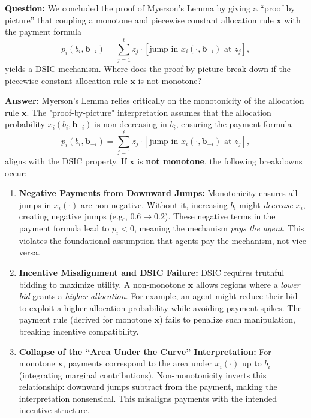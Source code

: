 \documentclass[12pt]{article}
\begin{document}
\textbf{Question:}  
We concluded the proof of Myerson’s Lemma by giving a “proof by picture” that coupling a monotone and piecewise constant allocation rule $\mathbf{x}$ with the payment formula
\[
p_i(b_i, \mathbf{b}_{-i}) = \sum_{j=1}^{\ell} z_j \cdot [\text{jump in } x_i(\cdot, \mathbf{b}_{-i}) \text{ at } z_j],
\]
yields a DSIC mechanism. Where does the proof-by-picture break down if the piecewise constant allocation rule $\mathbf{x}$ is not monotone?

\textbf{Answer:} Myerson’s Lemma relies critically on the monotonicity of the allocation rule $\mathbf{x}$. The "proof-by-picture" interpretation assumes that the allocation probability $x_i(b_i, \mathbf{b}_{-i})$ is non-decreasing in $b_i$, ensuring the payment formula
\[
p_i(b_i, \mathbf{b}_{-i}) = \sum_{j=1}^{\ell} z_j \cdot [\text{jump in } x_i(\cdot, \mathbf{b}_{-i}) \text{ at } z_j],
\]
aligns with the DSIC property. If $\mathbf{x}$ is \textbf{not monotone}, the following breakdowns occur:  

\begin{enumerate}
  \item \textbf{Negative Payments from Downward Jumps:}  
  Monotonicity ensures all jumps in $x_i(\cdot)$ are non-negative. Without it, increasing $b_i$ might \textit{decrease} $x_i$, creating negative jumps (e.g., $0.6 \to 0.2$). These negative terms in the payment formula lead to $p_i < 0$, meaning the mechanism \textit{pays the agent}. This violates the foundational assumption that agents pay the mechanism, not vice versa.

  \item \textbf{Incentive Misalignment and DSIC Failure:}  
  DSIC requires truthful bidding to maximize utility. A non-monotone $\mathbf{x}$ allows regions where a \textit{lower bid} grants a \textit{higher allocation}. For example, an agent might reduce their bid to exploit a higher allocation probability while avoiding payment spikes. The payment rule (derived for monotone $\mathbf{x}$) fails to penalize such manipulation, breaking incentive compatibility.

  \item \textbf{Collapse of the “Area Under the Curve” Interpretation:}  
  For monotone $\mathbf{x}$, payments correspond to the area under $x_i(\cdot)$ up to $b_i$ (integrating marginal contributions). Non-monotonicity inverts this relationship: downward jumps subtract from the payment, making the interpretation nonsensical. This misaligns payments with the intended incentive structure.
\end{enumerate}
\end{document}

